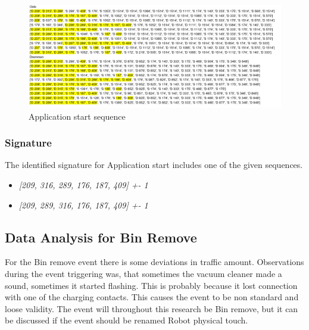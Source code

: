\begin{figure}[H]
    \centering
    \includegraphics[width=\textwidth]{figures/Sequence_AS.png}
    \caption{Application start sequence}
    \label{fig:ASseq}
\end{figure}

\subsubsection{Signature}
The identified signature for Application start includes one of the given sequences.
\begin{itemize}
    \item \textit{[209, 316, 289, 176, 187, 409] +- 1}
    \item \textit{[209, 289, 316, 176, 187, 409] +- 1}
\end{itemize}


\subsection{Data Analysis for Bin Remove}
For the Bin remove event there is some deviations in traffic amount. Observations during the event triggering was, that sometimes the vacuum cleaner made a sound, sometimes it started flashing. This is probably because it lost connection with one of the charging contacts. This causes the event to be non standard and loose validity. The event will throughout this research be Bin remove, but it can be discussed if the event should be renamed Robot physical touch. 

